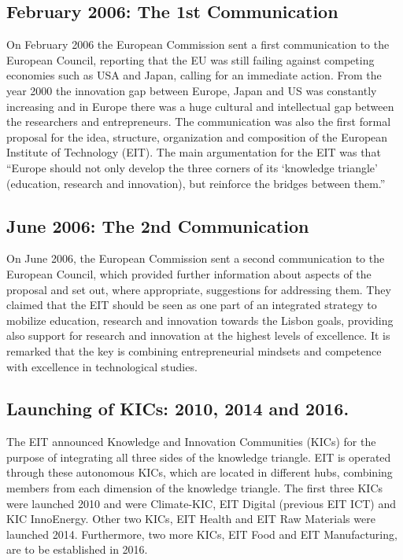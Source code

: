\documentclass[11pt,a4paper,oneside,twocolumn]{IEEEtran}
\begin{document}
\subsection{February 2006: The 1st Communication}
On February 2006 the European Commission sent a first communication to the European Council, reporting that the EU was still failing against competing economies such as USA and Japan, calling for an immediate action. From the year 2000 the innovation gap between Europe, Japan and US was constantly increasing and in Europe there was a huge cultural and intellectual gap between the researchers and entrepreneurs\cite{3_4}.
The communication was also the first formal proposal for the idea, structure, organization and composition of the European Institute of Technology (EIT). The main argumentation for the EIT was that “Europe should not only develop the three corners of its ‘knowledge triangle’ (education, research and innovation), but reinforce the bridges between them.''\cite{3_4}

\subsection{June 2006: The 2nd Communication}
On June 2006, the European Commission sent a second communication to the European Council, which provided further information about aspects of the proposal and set out, where appropriate, suggestions for addressing them. They claimed that the EIT should be seen as one part of an integrated strategy to mobilize education, research and innovation towards the Lisbon goals, providing also support for research and innovation at the highest levels of excellence. It is remarked that the key is combining entrepreneurial mindsets and competence with excellence in technological studies\cite{3_5}.

\subsection{Launching of KICs: 2010, 2014 and 2016.}
The EIT announced Knowledge and Innovation Communities (KICs) for the purpose of integrating all three sides of the knowledge triangle. EIT is operated through these autonomous KICs, which are located in different hubs, combining members from each dimension of the knowledge triangle. The first three KICs were launched 2010 and were Climate-KIC, EIT Digital (previous EIT ICT) and KIC InnoEnergy. Other two KICs, EIT Health and EIT Raw Materials were launched 2014. Furthermore, two more KICs, EIT Food and EIT Manufacturing, are to be established in 2016\cite{3_8}.
\end{document}
